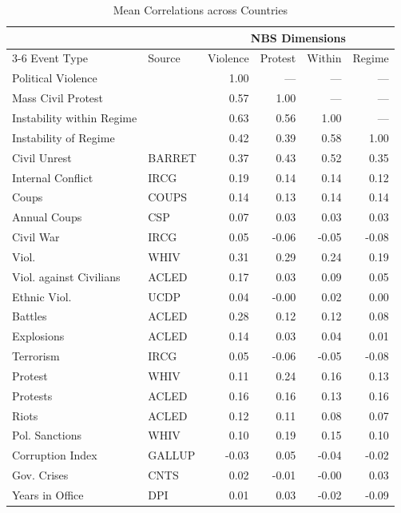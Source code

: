 \begin{table}[htbp]
\scriptsize
\centering
\caption{Mean Correlations across Countries}
\label{tab:mean_correlation_selected_events_ordered}
\begin{minipage}{0.7\linewidth}
\begin{tabular}{llrrrr}
\toprule
& & \multicolumn{4}{c}{NBS Dimensions} \\
\cmidrule(lr){3-6}
Event Type & Source & Violence & Protest & Within & Regime \\
\midrule
Political Violence &  & 1.00 & --- & --- & --- \\ 
  Mass Civil Protest &  & 0.57 & 1.00 & --- & --- \\ 
  Instability within Regime &  & 0.63 & 0.56 & 1.00 & --- \\ 
  Instability of Regime &  & 0.42 & 0.39 & 0.58 & 1.00 \\ 
  \midrule
  Civil Unrest & BARRET & 0.37 & 0.43 & 0.52 & 0.35 \\ 
  Internal Conflict & IRCG & 0.19 & 0.14 & 0.14 & 0.12 \\ 
  Coups & COUPS & 0.14 & 0.13 & 0.14 & 0.14 \\ 
  Annual Coups & CSP & 0.07 & 0.03 & 0.03 & 0.03 \\ 
  Civil War & IRCG & 0.05 & -0.06 & -0.05 & -0.08 \\ 
  Viol. & WHIV & 0.31 & 0.29 & 0.24 & 0.19 \\ 
  Viol. against Civilians & ACLED & 0.17 & 0.03 & 0.09 & 0.05 \\ 
  Ethnic Viol. & UCDP & 0.04 & -0.00 & 0.02 & 0.00 \\ 
  Battles & ACLED & 0.28 & 0.12 & 0.12 & 0.08 \\ 
  Explosions & ACLED & 0.14 & 0.03 & 0.04 & 0.01 \\ 
  Terrorism & IRCG & 0.05 & -0.06 & -0.05 & -0.08 \\ 
  Protest & WHIV & 0.11 & 0.24 & 0.16 & 0.13 \\ 
  Protests & ACLED & 0.16 & 0.16 & 0.13 & 0.16 \\ 
  Riots & ACLED & 0.12 & 0.11 & 0.08 & 0.07 \\ 
  Pol. Sanctions & WHIV & 0.10 & 0.19 & 0.15 & 0.10 \\ 
  Corruption Index & GALLUP & -0.03 & 0.05 & -0.04 & -0.02 \\ 
  Gov. Crises & CNTS & 0.02 & -0.01 & -0.00 & 0.03 \\ 
  Years in Office & DPI & 0.01 & 0.03 & -0.02 & -0.09 \\ 

\end{tabular}
\end{minipage}
\end{table}
